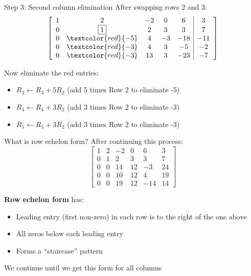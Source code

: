 \documentclass[aspectratio=169, lualatex, handout]{beamer}
\begin{document}
\begin{frame}{Step 3: Second column elimination}
	After swapping rows 2 and 3:
	\[
		\left[\begin{array}{ccccc|c}
				1 & 2                   & -2 & 0  & 6   & 3   \\
				0 & \boxed{1}           & 2  & 3  & 3   & 7   \\
				0 & \textcolor{red}{-5} & 4  & -3 & -18 & -11 \\
				0 & \textcolor{red}{-3} & 4  & 3  & -5  & -2  \\
				0 & \textcolor{red}{-3} & 13 & 3  & -23 & -7
			\end{array}\right]
	\]

	Now eliminate the red entries:
	\begin{itemize}
		\item $R_3 \leftarrow R_3 + 5R_2$ (add 5 times Row 2 to eliminate -5)
		\item $R_4 \leftarrow R_4 + 3R_2$ (add 3 times Row 2 to eliminate -3)
		\item $R_5 \leftarrow R_5 + 3R_2$ (add 3 times Row 2 to eliminate -3)
	\end{itemize}
\end{frame}

\begin{frame}{What is row echelon form?}
	After continuing this process:
	\[
		\left[\begin{array}{ccccc|c}
				1 & 2 & -2 & 0  & 6   & 3  \\
				0 & 1 & 2  & 3  & 3   & 7  \\
				0 & 0 & 14 & 12 & -3  & 24 \\
				0 & 0 & 10 & 12 & 4   & 19 \\
				0 & 0 & 19 & 12 & -14 & 14
			\end{array}\right]
	\]

	\textbf{Row echelon form} has:
	\begin{itemize}
		\item Leading entry (first non-zero) in each row is to the right of the one above
		\item All zeros below each leading entry
		\item Forms a ``staircase'' pattern
	\end{itemize}

	We continue until we get this form for all columns
\end{frame}
\end{document}
